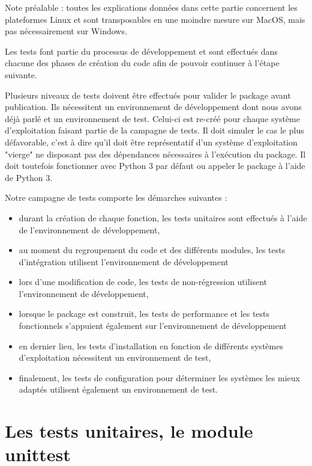 \documentclass[twoside,a4paper,11pt,frenchb,openany]{report}
\begin{document}
Note préalable : toutes les explications données dans cette partie concernent les plateformes Linux et sont transposables en une moindre mesure sur MacOS, mais pas nécessairement sur Windows.

Les tests font partie du processus de développement et sont effectués dans chacune des phases de création du code afin de pouvoir continuer à l'étape suivante.

Plusieurs niveaux de tests doivent être effectués pour valider le package avant publication. Ils nécessitent un environnement de développement dont nous avons déjà parlé et un environnement de test. Celui-ci est re-créé pour chaque système d'exploitation faisant partie de la campagne de tests. Il doit simuler le cas le plus défavorable, c'est à dire qu'il doit être représentatif d'un système d'exploitation "vierge" ne disposant pas des dépendances nécessaires à l'exécution du package. Il doit toutefois fonctionner avec Python 3 par défaut ou appeler le package à l'aide de Python 3. 

Notre campagne de tests comporte les démarches suivantes :
\begin{itemize}
\item durant la création de chaque fonction, les tests unitaires sont effectués à l'aide de l'environnement de développement,
\item au moment du regroupement du code et des différents modules, les tests d'intégration utilisent l'environnement de développement
\item lors d'une modification de code, les tests de non-régression utilisent l'environnement de développement,
\item lorsque le package est construit, les tests de performance et les tests fonctionnels s'appuient également sur l'environnement de développement
\item en dernier lieu, les tests d'installation en fonction de différents systèmes d'exploitation nécessitent un environnement de test,
\item finalement, les tests de configuration pour déterminer les systèmes les mieux adaptés utilisent également un environnement de test.
\end{itemize}







\section{Les tests unitaires, le module unittest}
\end{document}
